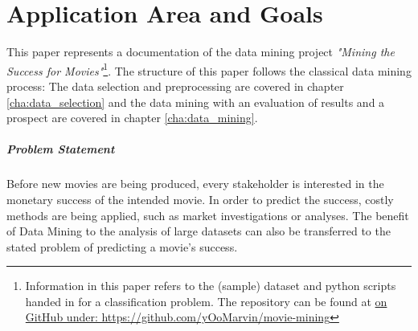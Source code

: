 \begingroup
\renewcommand{\cleardoublepage}{}
\renewcommand{\clearpage}{}
\chapter{Application Area and Goals}\label{chap:area_goals}
\endgroup


This paper represents a documentation of the data mining project \textit{"Mining the Success for Movies"}\footnote{Information in this paper refers to the (sample) dataset and python scripts handed in for a classification problem. The repository can be found at \hyperref{https://github.com/yOoMarvin/movie-mining}{external}{github}{on GitHub under: https://github.com/yOoMarvin/movie-mining}}. The structure of this paper follows the classical data mining process: The data selection and preprocessing are covered in chapter \ref{cha:data_selection} and the data mining with an evaluation of results and a prospect are covered in chapter \ref{cha:data_mining}.


\paragraph{Problem Statement}
Before new movies are being produced, every stakeholder is interested in the monetary success of the intended movie. In order to predict the success, costly methods are being applied, such as market investigations or analyses. The benefit of Data Mining to the analysis of large datasets can also be transferred to the stated problem of predicting a movie's success. %

